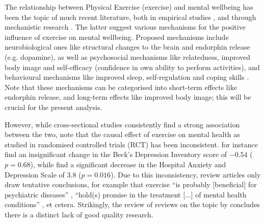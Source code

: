 The relationship between Physical Exercise (exercise) and mental wellbeing has been the topic of much recent literature,
both in empirical studies \cite{noetel2024effect, mahindru2023role}, and through mechanistic research \cite{smith2021role, lubans2016physical}.
The latter suggest various mechanisms for the positive influence of exercise on mental wellbeing.
Proposed mechanisms include neurobiological ones like structural changes to the brain and endorphin release (e.g. dopamine),
as well as psychosocial mechanisms like relatedness, improved body image and self-efficacy (confidence in own ability to perform activities),
and behavioural mechanisms like improved sleep, self-regulation and coping skills \cite{lubans2016physical}.
Note that these mechanisms can be categorised into short-term effects like endorphin release, and long-term effects
like improved body image; this will be crucial for the present analysis.

However, while cross-sectional studies consistently find a strong association between the two, 
note that the causal effect of exercise on mental health as studied in randomised controlled trials (RCT) has been inconsistent.
 for instance find an insignificant change in the Beck's Depression Inventory score
of $-0.54$ ($p = 0.68$), while  find a significant decrease in the Hospital Anxiety and
Depression Scale of $3.8$ ($p = 0.016$).
Due to this inconsistency, review articles only draw tentative conclusions, for example that exercise ``is probably [beneficial]
for psychiatric diseases'' \cite{peluso2005physical}, ``hold(s) promise in the treatment [...] of mental health conditions''
\cite{smith2021role}, et cetera.
Strikingly, the review of reviews on the topic by  concludes there is a distinct lack of good quality research.

